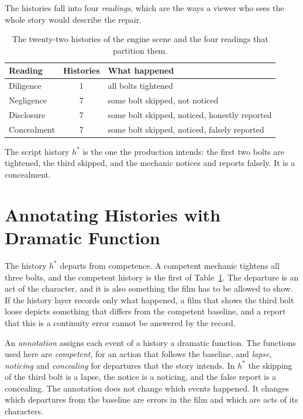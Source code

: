 \documentclass[11pt,twoside,openright]{book}
\theoremstyle{plain}
\theoremstyle{definition}
\theoremstyle{remark}
\begin{document}
The histories fall into four \emph{readings}, which are the ways a viewer who sees the whole story would describe the repair.

\begin{table}[ht]
\centering
\begin{tabular}{@{}lcl@{}}
\toprule
Reading & Histories & What happened\\
\midrule
Diligence & 1 & all bolts tightened\\
Negligence & 7 & some bolt skipped, not noticed\\
Disclosure & 7 & some bolt skipped, noticed, honestly reported\\
Concealment & 7 & some bolt skipped, noticed, falsely reported\\
\bottomrule
\end{tabular}
\caption{The twenty-two histories of the engine scene and the four readings that partition them.}\label{tab:readings}
\end{table}

The script history $h^\ast$ is the one the production intends: the first two bolts are tightened, the third skipped, and the mechanic notices and reports falsely. It is a concealment.

\section{Annotating Histories with Dramatic Function}\label{sec:annotate}

The history $h^\ast$ departs from competence. A competent mechanic tightens all three bolts, and the competent history is the first of Table~\ref{tab:readings}. The departure is an act of the character, and it is also something the film has to be allowed to show. If the history layer records only what happened, a film that shows the third bolt loose depicts something that differs from the competent baseline, and a report that this is a continuity error cannot be answered by the record.

An \emph{annotation} assigns each event of a history a dramatic function. The functions used here are \emph{competent}, for an action that follows the baseline, and \emph{lapse}, \emph{noticing} and \emph{concealing} for departures that the story intends. In $h^\ast$ the skipping of the third bolt is a lapse, the notice is a noticing, and the false report is a concealing. The annotation does not change which events happened. It changes which departures from the baseline are errors in the film and which are acts of its characters.
\end{document}
